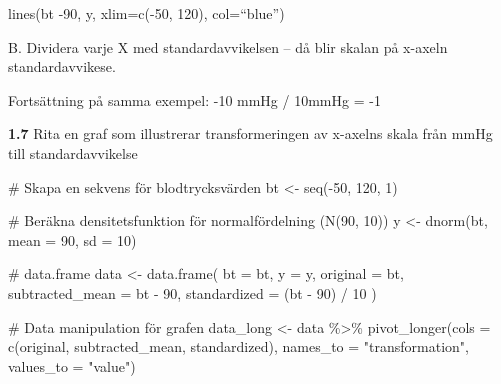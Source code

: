\documentclass[
  letterpaper,
  DIV=11,
  numbers=noendperiod]{scrartcl}
\newenvironment{Shaded}{\begin{snugshade}}{\end{snugshade}}
\newcommand{\AttributeTok}[1]{\textcolor[rgb]{0.40,0.45,0.13}{#1}}
\newcommand{\CommentTok}[1]{\textcolor[rgb]{0.37,0.37,0.37}{#1}}
\newcommand{\DecValTok}[1]{\textcolor[rgb]{0.68,0.00,0.00}{#1}}
\newcommand{\FunctionTok}[1]{\textcolor[rgb]{0.28,0.35,0.67}{#1}}
\newcommand{\NormalTok}[1]{\textcolor[rgb]{0.00,0.23,0.31}{#1}}
\newcommand{\OtherTok}[1]{\textcolor[rgb]{0.00,0.23,0.31}{#1}}
\newcommand{\SpecialCharTok}[1]{\textcolor[rgb]{0.37,0.37,0.37}{#1}}
\newcommand{\StringTok}[1]{\textcolor[rgb]{0.13,0.47,0.30}{#1}}
\begin{document}
lines(bt -90, y, xlim=c(-50, 120), col=``blue'')

B. Dividera varje X med standardavvikelsen -- då blir skalan på x-axeln
standardavvikese.

Fortsättning på samma exempel: -10 mmHg / 10mmHg = -1

\textbf{1.7} Rita en graf som illustrerar transformeringen av x-axelns
skala från mmHg till standardavvikelse

\begin{Shaded}
\begin{Highlighting}[]
\CommentTok{\# Skapa en sekvens för blodtrycksvärden}
\NormalTok{bt }\OtherTok{\textless{}{-}} \FunctionTok{seq}\NormalTok{(}\SpecialCharTok{{-}}\DecValTok{50}\NormalTok{, }\DecValTok{120}\NormalTok{, }\DecValTok{1}\NormalTok{)}

\CommentTok{\# Beräkna densitetsfunktion för normalfördelning (N(90, 10))}
\NormalTok{y }\OtherTok{\textless{}{-}} \FunctionTok{dnorm}\NormalTok{(bt, }\AttributeTok{mean =} \DecValTok{90}\NormalTok{, }\AttributeTok{sd =} \DecValTok{10}\NormalTok{)}

\CommentTok{\# data.frame}
\NormalTok{data }\OtherTok{\textless{}{-}} \FunctionTok{data.frame}\NormalTok{(}
  \AttributeTok{bt =}\NormalTok{ bt,}
  \AttributeTok{y =}\NormalTok{ y,}
  \AttributeTok{original =}\NormalTok{ bt,}
  \AttributeTok{subtracted\_mean =}\NormalTok{ bt }\SpecialCharTok{{-}} \DecValTok{90}\NormalTok{,}
  \AttributeTok{standardized =}\NormalTok{ (bt }\SpecialCharTok{{-}} \DecValTok{90}\NormalTok{) }\SpecialCharTok{/} \DecValTok{10}
\NormalTok{)}

\CommentTok{\# Data manipulation för grafen}
\NormalTok{data\_long }\OtherTok{\textless{}{-}}\NormalTok{ data }\SpecialCharTok{\%\textgreater{}\%}
  \FunctionTok{pivot\_longer}\NormalTok{(}\AttributeTok{cols =} \FunctionTok{c}\NormalTok{(original, subtracted\_mean, standardized),}
               \AttributeTok{names\_to =} \StringTok{"transformation"}\NormalTok{,}
               \AttributeTok{values\_to =} \StringTok{"value"}\NormalTok{)}


\end{Highlighting}
\end{Shaded}
\end{document}
